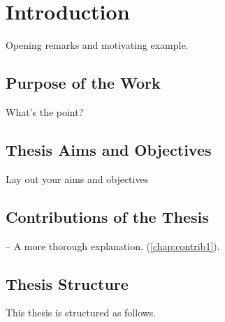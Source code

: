 \chapter{Introduction}\label{chap:intro}
Opening remarks and motivating example.

\section{Purpose of the Work}
What's the point?

\section{Thesis Aims and Objectives}
Lay out your aims and objectives



\section{Contributions of the Thesis}
\label{contrib:first} -- A more thorough explanation. (\autoref{chap:contrib1}).

\section{Thesis Structure}
This thesis is structured as follows.
